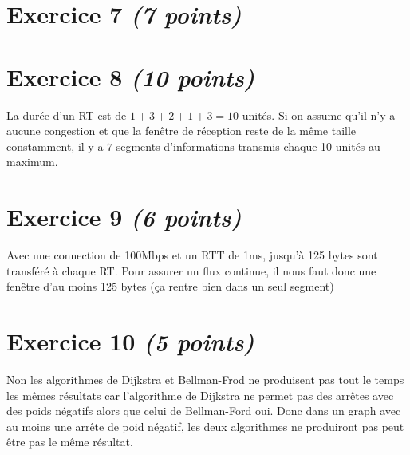 \documentclass{article}
\begin{document}
\section{Exercice 7 \emph{(7 points)}}

\clearpage

\section{Exercice 8 \emph{(10 points)}}
La durée d'un RT est de $1 + 3 + 2 + 1 + 3 = 10$ unités. Si on assume qu'il n'y a aucune congestion et que la fenêtre de réception reste de la même taille constamment, il y a $7$ segments d'informations transmis chaque 10 unités au maximum.


\section{Exercice 9 \emph{(6 points)}}
Avec  une connection de 100Mbps et un RTT de 1ms, jusqu'à 125 bytes sont transféré à chaque RT.
Pour assurer un flux continue, il nous faut donc une fenêtre d'au moins 125 bytes (ça rentre bien dans un seul segment)


\section{Exercice 10 \emph{(5 points)}}

Non les algorithmes de Dijkstra et Bellman-Frod ne produisent pas tout le temps les mêmes résultats car l'algorithme de Dijkstra ne permet pas des arrêtes avec des poids négatifs alors que celui de Bellman-Ford oui. Donc dans un graph avec au moins une arrête de poid négatif, les deux algorithmes ne produiront pas peut être pas le même résultat.
\end{document}
